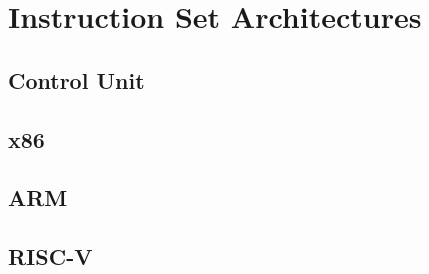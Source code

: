 \section{Instruction Set Architectures}

\subsection{Control Unit}

\subsection{x86} 

\subsection{ARM}

\subsection{RISC-V}

